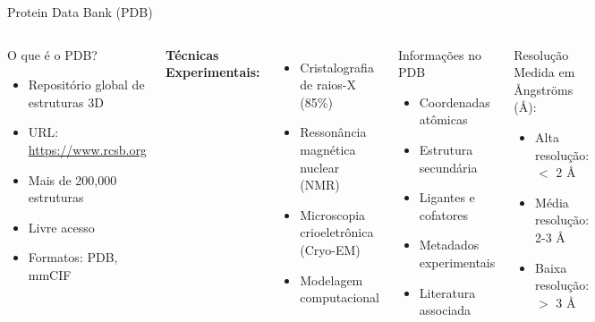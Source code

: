 \begin{frame}[shrink=10]{Protein Data Bank (PDB)}
\begin{columns}
\begin{block}{O que é o PDB?}
\begin{itemize}
    \item Repositório global de estruturas 3D
    \item URL: \url{https://www.rcsb.org}
    \item Mais de 200,000 estruturas
    \item Livre acesso
    \item Formatos: PDB, mmCIF
\end{itemize}
\end{block}

\textbf{Técnicas Experimentais:}
\begin{itemize}
    \item Cristalografia de raios-X (85\%)
    \item Ressonância magnética nuclear (NMR)
    \item Microscopia crioeletrônica (Cryo-EM)
    \item Modelagem computacional
\end{itemize}

\begin{exampleblock}{Informações no PDB}
\begin{itemize}
    \item Coordenadas atômicas
    \item Estrutura secundária
    \item Ligantes e cofatores
    \item Metadados experimentais
    \item Literatura associada
\end{itemize}
\end{exampleblock}

\vspace{0.3cm}

\begin{alertblock}{Resolução}
Medida em Ångströms (\AA):
\begin{itemize}
    \item Alta resolução: $<$ 2 \AA
    \item Média resolução: 2-3 \AA
    \item Baixa resolução: $>$ 3 \AA
\end{itemize}
\end{alertblock}
\end{columns}
\end{frame}

